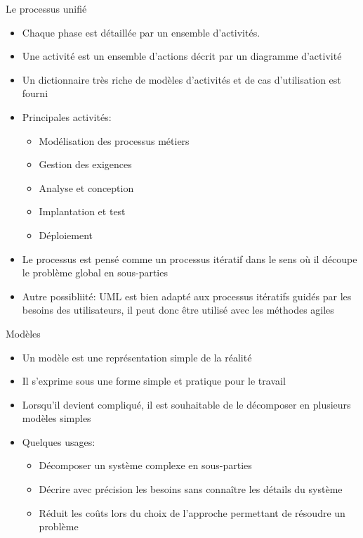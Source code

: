 \documentclass[14pt]{beamer}
\begin{document}
\begin{framentitle}{Le processus unifié}
    \begin{itemize}
        \item Chaque phase est détaillée par un ensemble d'activités.
        \item Une activité est un ensemble d'actions décrit par un diagramme
            d'activité
        \item Un dictionnaire très riche de modèles d'activités et de cas
            d'utilisation est fourni
        \item Principales activités:
            \begin{itemize}
                \item Modélisation des processus métiers
                \item Gestion des exigences
                \item Analyse et conception
                \item Implantation et test
                \item Déploiement
            \end{itemize}

        \item Le processus est pensé comme un processus itératif dans le sens où
            il découpe le problème global en sous-parties
        \item Autre possibliité: UML est bien adapté aux processus itératifs
            guidés par les besoins des utilisateurs, il peut donc être utilisé
            avec les méthodes agiles
    \end{itemize}
\end{framentitle}



\begin{framentitle}{Modèles}
    \begin{itemize}
        \item Un modèle est une représentation simple de la réalité
        \item Il s'exprime sous une forme simple et pratique pour le travail
        \item Lorsqu'il devient compliqué, il est souhaitable de le décomposer
            en plusieurs modèles simples
        \item Quelques usages:
            \begin{itemize}
                \item Décomposer un système complexe en sous-parties
                \item Décrire avec précision les besoins sans connaître les
                    détails du système
                \item Réduit les coûts lors du choix de l'approche permettant de
                    résoudre un problème
            \end{itemize}
    \end{itemize}
\end{framentitle}
\end{document}
